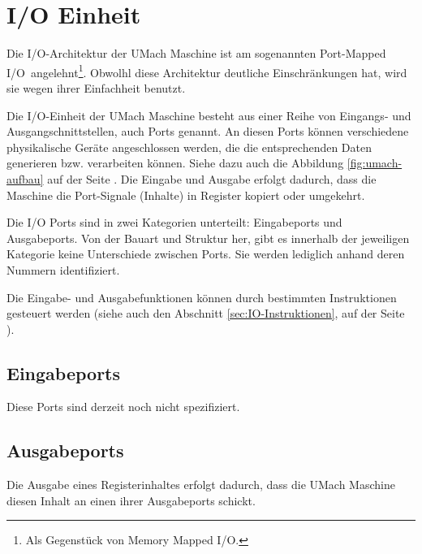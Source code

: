 \section{I/O Einheit}
\label{sec:IO-Einheit}

Die I/O-Architektur der UMach Maschine ist am sogenannten \glqq Port-Mapped
I/O\grqq\ angelehnt\footnote{Als Gegenstück von \glqq Memory Mapped I/O\grqq.}.
Obwolhl diese Architektur deutliche Einschränkungen hat, wird sie wegen ihrer
Einfachheit benutzt.


Die I/O-Einheit der UMach Maschine besteht aus einer Reihe von Eingangs- und
Ausgangschnittstellen, auch Ports genannt. An
diesen Ports können verschiedene physikalische Geräte angeschlossen werden, die
die entsprechenden Daten generieren bzw. verarbeiten können. Siehe dazu auch die
Abbildung \ref{fig:umach-aufbau} auf der Seite \pageref{fig:umach-aufbau}.
Die Eingabe und Ausgabe erfolgt dadurch, dass die Maschine die Port-Signale
(Inhalte) in Register kopiert oder umgekehrt.


Die I/O Ports sind in zwei Kategorien unterteilt: Eingabeports und
Ausgabeports. Von der Bauart und Struktur her, gibt es innerhalb der jeweiligen
Kategorie keine Unterschiede zwischen Ports. Sie werden lediglich anhand deren
Nummern identifiziert.


Die Eingabe- und Ausgabefunktionen können durch bestimmten Instruktionen
gesteuert werden (siehe auch den Abschnitt \ref{sec:IO-Instruktionen}, auf der
Seite \pageref{sec:IO-Instruktionen}).



\subsection{Eingabeports}

Diese Ports sind derzeit noch nicht spezifiziert.



\subsection{Ausgabeports}
\label{subsec:Ausgabeports}

Die Ausgabe eines Registerinhaltes erfolgt dadurch, dass die UMach Maschine
diesen Inhalt an einen ihrer Ausgabeports schickt.

